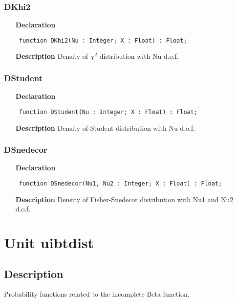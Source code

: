 \documentclass[12pt,a4paper,oneside]{report}
\newcommand{\declarationitem}[1]{\textbf{#1}}
\newcommand{\descriptiontitle}[1]{\textbf{#1}}
\newcommand{\code}[1]{\texttt{#1}}
\begin{document}
\subsubsection{DKhi2}
\label{ugamdist-DKhi2}
\begin{itemize}\item[\declarationitem{Declaration}\hfill]
	\begin{flushleft}
		\code{
			function DKhi2(Nu : Integer; X : Float) : Float;}
	\end{flushleft}
	\item[\descriptiontitle{Description}]
	Density of $\chi^2$ distribution with Nu d.o.f.
\end{itemize}
\subsubsection{DStudent}
\label{ugamdist-DStudent}
\begin{itemize}\item[\declarationitem{Declaration}\hfill]
	\begin{flushleft}
		\code{
			function DStudent(Nu : Integer; X : Float) : Float;}
	\end{flushleft}
	\item[\descriptiontitle{Description}]
	Density of Student distribution with Nu d.o.f.
\end{itemize}
\subsubsection{DSnedecor}
\label{ugamdist-DSnedecor}
\begin{itemize}\item[\declarationitem{Declaration}\hfill]
	\begin{flushleft}
		\code{
			function DSnedecor(Nu1, Nu2 : Integer; X : Float) : Float;}
	\end{flushleft}
	\item[\descriptiontitle{Description}]
	Density of Fisher{-}Snedecor distribution with Nu1 and Nu2 d.o.f.
\end{itemize}
\section{Unit uibtdist}
\label{uibtdist}
\subsection{Description}
Probability functions related to the incomplete Beta function.
\end{document}
